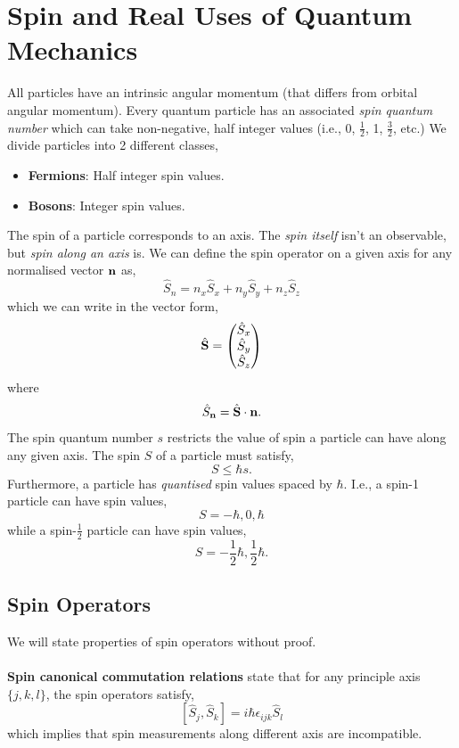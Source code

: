 \documentclass{book}
\begin{document}
\chapter{Spin and Real Uses of Quantum Mechanics}
All particles have an intrinsic angular momentum (that differs from orbital angular momentum). Every quantum particle has an associated \textit{spin quantum number} which can take non-negative, half integer values (i.e., 0, $\frac{1}{2}$, 1, $\frac{3}{2}$, etc.) We divide particles into 2 different classes,
\begin{itemize}
	\item \textbf{Fermions}: Half integer spin values.
	\item \textbf{Bosons}: Integer spin values.
\end{itemize}
The spin of a particle corresponds to an axis. The \textit{spin itself} isn't an observable, but \textit{spin along an axis} is. We can define the spin operator on a given axis for any normalised vector $\vb{n}$ as,
\begin{equation}
	\hat{S}_n = n_x\hat{S}_x + n_y\hat{S}_y + n_z\hat{S}_z
\end{equation}
which we can write in the vector form,
\begin{equation}
	\hat{\vb{S}} = \begin{pmatrix}
		\hat{S}_x \\ \hat{S}_y \\ \hat{S}_z
	\end{pmatrix}
\end{equation}
where 
\begin{equation}
	\hat{S}_{\vb{n}} = \hat{\vb{S}}\cdot\vb{n}.
\end{equation}
The spin quantum number $s$ restricts the value of spin a particle can have along any given axis. The spin $S$ of a particle must satisfy,
\begin{equation}
	S \leq \hbar s.
\end{equation}
Furthermore, a particle has \textit{quantised} spin values spaced by $\hbar$. I.e., a spin-1 particle can have spin values,
\begin{equation}
	S = -\hbar, 0, \hbar
\end{equation} 
while a spin-$\frac{1}{2}$ particle can have spin values,
\begin{equation}
	S = -\frac{1}{2}\hbar, \frac{1}{2}\hbar.
\end{equation}
\section{Spin Operators}
We will state properties of spin operators without proof.
\\\\
\textbf{Spin canonical commutation relations} state that for any principle axis $\{j,k,l\}$, the spin operators satisfy,
\begin{equation}
	\left[\hat{S}_j,\hat{S}_k\right] = i\hbar\epsilon_{ijk}\hat{S}_l
\end{equation}
which implies that spin measurements along different axis are incompatible. 
\end{document}
